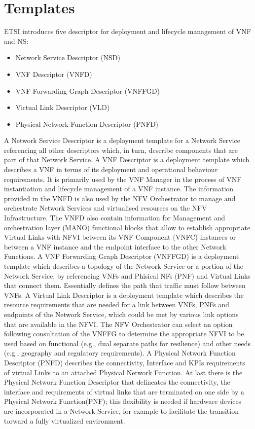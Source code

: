 \section{Templates}

ETSI introduces five descriptor for deployment and lifecycle management of VNF and NS:
\begin{itemize}
	\item Network Service Descriptor (NSD)
	\item VNF Descriptor (VNFD)
	\item VNF Forwarding Graph Descriptor (VNFFGD)
	\item Virtual Link Descriptor (VLD) 
	\item Physical Network Function Descriptor (PNFD) 
\end{itemize}

A Network Service Descriptor is a deployment template for a Network Service referencing all other descriptors which, in turn, describe components that are part of that Network Service. A VNF Descriptor is a deployment template which describes a VNF in terms of its deployment and operational behaviour requirements. It is primarily used by the VNF Manager in the process of VNF instantiation and lifecycle management of a VNF instance. The information provided in the VNFD is also used by the NFV Orchestrator to manage and orchestrate Network Services and virtualised resources on the NFV Infrastructure. The VNFD olso contain information for Management and orchestration layer (MANO) functional blocks that allow to establish appropriate Virtual Links with NFVI between its VNF Component (VNFC) instances or between a VNF instance and the endpoint interface to the other Network Functions. A VNF Forwarding Graph Descriptor (VNFFGD) is a deployment template which describes a topology of the Network Service or a portion of the Network Service, by referencing  VNFs and Phisical NFs (PNF) and Virtual Links that connect them. Essentially defines the path  that traffic must follow between VNFs. A Virtual Link Descriptor is a deployment template which describes the resource requirements that are needed for a link between VNFs, PNFs and endpoints of the Network Service, which could be met by various link options that are available in the NFVI. The NFV Orchestrator can select an option following consultation of the VNFFG to determine the appropriate NFVI to be used based on functional (e.g., dual separate paths for resilience) and other needs (e.g., geography and regulatory requirements). 
A Physical Network Function Descriptor (PNFD) describes the connectivity, Interface and KPIs requirements of virtual Links to an attached Physical Network Function.
At last there is the Physical Network Function Descriptor that delineates the connectivity, the interface and  requirements of virtual links that are terminated on one side by a Physical Network Function(PNF); this flexibility is needed if hardware devices are incorporated in a Network Service, for example to facilitate the transition torward a fully virtualized environment.


